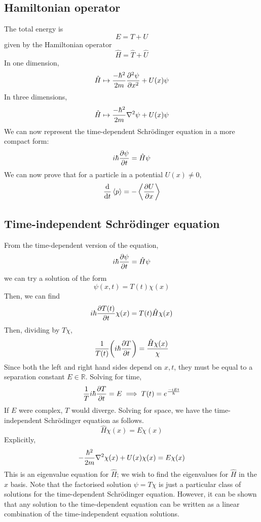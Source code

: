 \subsection{Hamiltonian operator}
The total energy is
\[
	E = T + U
\]
given by the Hamiltonian operator
\[
	\hat H = \hat T + \hat U
\]
In one dimension,
\[
	\hat H \mapsto \frac{-\hbar^2}{2m} \pdv[2]{\psi}{x} + U(x) \psi
\]
In three dimensions,
\[
	\hat H \mapsto \frac{-\hbar^2}{2m} \laplacian \psi + U(x) \psi
\]
We can now represent the time-dependent Schr\"odinger equation in a more compact form:
\[
	i\hbar \pdv{\psi}{t} = \hat H \psi
\]
We can now prove that for a particle in a potential \( U(x) \neq 0 \),
\[
	\dv{t} \left\langle{p}\right\rangle = -\left\langle{\pdv{U}{x}}\right\rangle
\]

\subsection{Time-independent Schr\"odinger equation}
From the time-dependent version of the equation,
\[
	i\hbar \pdv{\psi}{t} = \hat H \psi
\]
we can try a solution of the form
\[
	\psi(x,t) = T(t) \chi(x)
\]
Then, we can find
\[
	i \hbar \pdv{T(t)}{t} \chi(x) = T(t) \hat H \chi(x)
\]
Then, dividing by \( T \chi \),
\[
	\frac{1}{T(t)} \qty(i \hbar \pdv{T}{t}) = \frac{\hat H \chi(x)}{\chi}
\]
Since both the left and right hand sides depend on \( x, t \), they must be equal to a separation constant \( E \in \mathbb R \).
Solving for time,
\[
	\frac{1}{T} i \hbar \pdv{T}{t} = E \implies T(t) = e^{\frac{-i Et}{\hbar}}
\]
If \( E \) were complex, \( T \) would diverge.
Solving for space, we have the time-independent Schr\"odinger equation as follows.
\[
	\hat H \chi(x) = E \chi(x)
\]
Explicitly,
\[
	-\frac{\hbar^2}{2m} \laplacian{\chi(x)} + U(x) \chi(x) = E \chi(x)
\]
This is an eigenvalue equation for \( \hat H \); we wish to find the eigenvalues for \( \hat H \) in the \( x \) basis.
Note that the factorised solution \( \psi = T \chi \) is just a particular class of solutions for the time-dependent Schr\"odinger equation.
However, it can be shown that any solution to the time-dependent equation can be written as a linear combination of the time-independent equation solutions.
